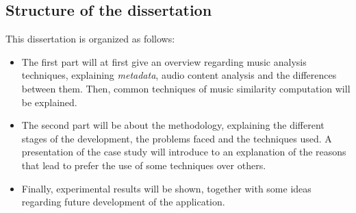 \subsection{Structure of the dissertation}
This dissertation is organized as follows:
\begin{itemize}
\item The first part will at first give an overview regarding music analysis techniques, explaining \textit{metadata}, audio content analysis and the differences between them. Then, common techniques of music similarity computation will be explained. 
\item The second part will be about the methodology, explaining the different stages of the development, the problems faced and the techniques used. A presentation of the case study will introduce to an explanation of the reasons that lead to prefer the use of some techniques over others.
\item Finally, experimental results will be shown, together with some ideas regarding future development of the application.
\end{itemize}


\newpage
\thispagestyle{headings}
\mbox{}